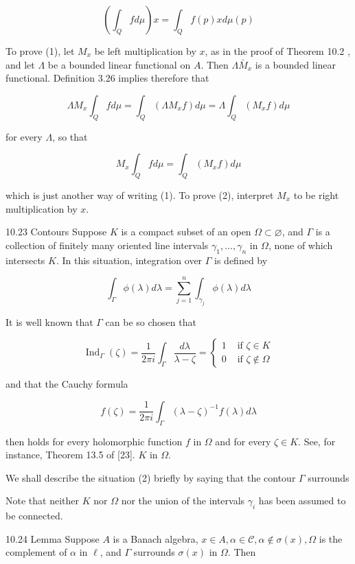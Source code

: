 \documentclass[10pt]{article}
\begin{document}
$$
\left(\int_{Q} f d \mu\right) x=\int_{Q} f(p) x d \mu(p)
$$

To prove (1), let $M_{x}$ be left multiplication by $x$, as in the proof of Theorem 10.2 , and let $\Lambda$ be a bounded linear functional on $A$. Then $\Lambda \bar{M}_{x}$ is a bounded linear functional. Definition 3.26 implies therefore that

$$
\Lambda M_{x} \int_{Q} f d \mu=\int_{Q}\left(\Lambda M_{x} f\right) d \mu=\Lambda \int_{Q}\left(M_{x} f\right) d \mu
$$

for every $\Lambda$, so that

$$
M_{x} \int_{Q} f d \mu=\int_{Q}\left(M_{x} f\right) d \mu
$$

which is just another way of writing (1). To prove (2), interpret $M_{x}$ to be right multiplication by $x$.

10.23 Contours Suppose $K$ is a compact subset of an open $\Omega \subset \varnothing$, and $\Gamma$ is a collection of finitely many oriented line intervals $\gamma_{1}, \ldots, \gamma_{n}$ in $\Omega$, none of which intersects $K$. In this situation, integration over $\Gamma$ is defined by

$$
\int_{\Gamma} \phi(\lambda) d \lambda=\sum_{j=1}^{n} \int_{\gamma_{j}} \phi(\lambda) d \lambda
$$

It is well known that $\Gamma$ can be so chosen that

$$
\operatorname{Ind}_{\Gamma}(\zeta)=\frac{1}{2 \pi i} \int_{\Gamma} \frac{d \lambda}{\lambda-\zeta}= \begin{cases}1 & \text { if } \zeta \in K \\ 0 & \text { if } \zeta \notin \Omega\end{cases}
$$

and that the Cauchy formula

$$
f(\zeta)=\frac{1}{2 \pi i} \int_{\Gamma}(\lambda-\zeta)^{-1} f(\lambda) d \lambda
$$

then holds for every holomorphic function $f$ in $\Omega$ and for every $\zeta \in K$. See, for instance, Theorem 13.5 of [23]. $K$ in $\Omega$.

We shall describe the situation (2) briefly by saying that the contour $\Gamma$ surrounds

Note that neither $K$ nor $\Omega$ nor the union of the intervals $\gamma_{i}$ has been assumed to be connected.

10.24 Lemma Suppose $A$ is a Banach algebra, $x \in A, \alpha \in \mathscr{C}, \alpha \notin \sigma(x), \Omega$ is the complement of $\alpha$ in $\ell$, and $\Gamma$ surrounds $\sigma(x)$ in $\Omega$. Then
\end{document}
